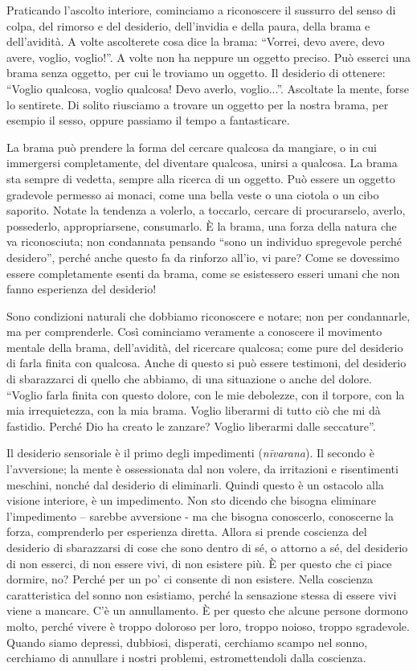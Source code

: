 
Praticando l'ascolto interiore, cominciamo a riconoscere il sussurro del
senso di colpa, del rimorso e del desiderio, dell'invidia e della paura,
della brama e dell'avidità. A volte ascolterete cosa dice la brama:
``Vorrei, devo avere, devo avere, voglio, voglio!''. A volte non ha
neppure un oggetto preciso. Può esserci una brama senza oggetto, per cui
le troviamo un oggetto. Il desiderio di ottenere: ``Voglio qualcosa,
voglio qualcosa! Devo averlo, voglio...''. Ascoltate la mente, forse lo
sentirete. Di solito riusciamo a trovare un oggetto per la nostra brama,
per esempio il sesso, oppure passiamo il tempo a fantasticare.

La brama può prendere la forma del cercare qualcosa da mangiare, o in
cui immergersi completamente, del diventare qualcosa, unirsi a qualcosa.
La brama sta sempre di vedetta, sempre alla ricerca di un oggetto. Può
essere un oggetto gradevole permesso ai monaci, come una bella veste o
una ciotola o un cibo saporito. Notate la tendenza a volerlo, a
toccarlo, cercare di procurarselo, averlo, possederlo, appropriarsene,
consumarlo. È la brama, una forza della natura che va riconosciuta; non
condannata pensando ``sono un individuo spregevole perché desidero'',
perché anche questo fa da rinforzo all'io, vi pare? Come se dovessimo
essere completamente esenti da brama, come se esistessero esseri umani
che non fanno esperienza del desiderio!

Sono condizioni naturali che dobbiamo riconoscere e notare; non per
condannarle, ma per comprenderle. Così cominciamo veramente a conoscere
il movimento mentale della brama, dell'avidità, del ricercare qualcosa;
come pure del desiderio di farla finita con qualcosa. Anche di questo si
può essere testimoni, del desiderio di sbarazzarci di quello che
abbiamo, di una situazione o anche del dolore. ``Voglio farla finita con
questo dolore, con le mie debolezze, con il torpore, con la mia
irrequietezza, con la mia brama. Voglio liberarmi di tutto ciò che mi dà
fastidio. Perché Dio ha creato le zanzare? Voglio liberarmi dalle
seccature''.

Il desiderio sensoriale è il primo degli impedimenti (\textit{nīvarana}). Il
secondo è l'avversione; la mente è ossessionata dal non volere, da
irritazioni e risentimenti meschini, nonché dal desiderio di eliminarli.
Quindi questo è un ostacolo alla visione interiore, è un impedimento.
Non sto dicendo che bisogna eliminare l'impedimento – sarebbe avversione
- ma che bisogna conoscerlo, conoscerne la forza, comprenderlo per
esperienza diretta. Allora si prende coscienza del desiderio di
sbarazzarsi di cose che sono dentro di sé, o attorno a sé, del desiderio
di non esserci, di non essere vivi, di non esistere più. È per questo
che ci piace dormire, no? Perché per un po' ci consente di non esistere.
Nella coscienza caratteristica del sonno non esistiamo, perché la
sensazione stessa di essere vivi viene a mancare. C'è un annullamento.
È per questo che alcune persone dormono molto, perché vivere è troppo
doloroso per loro, troppo noioso, troppo sgradevole. Quando siamo
depressi, dubbiosi, disperati, cerchiamo scampo nel sonno, cerchiamo di
annullare i nostri problemi, estromettendoli dalla coscienza.

